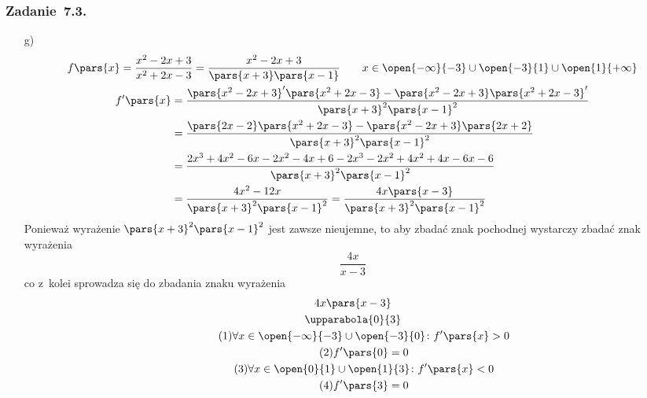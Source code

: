 \subsubsection*{Zadanie~7.3.}
\begin{itemize}
    \item[g)]
        \begin{gather*}
            f\pars{x} = \frac{x^2 - 2x + 3}{x^2 + 2x - 3} = \frac{x^2 - 2x + 3}{\pars{x + 3}\pars{x - 1}} \qquad x \in \open{-\infty}{-3} \cup \open{-3}{1} \cup \open{1}{+\infty}\\
            \begin{split}
                f'\pars{x}
                    &= \frac{\pars{x^2 - 2x + 3}'\pars{x^2 + 2x - 3} - \pars{x^2 - 2x + 3}\pars{x^2 + 2x - 3}'}{\pars{x + 3}^2\pars{x - 1}^2}\\
                    &= \frac{\pars{2x - 2}\pars{x^2 + 2x - 3} - \pars{x^2 - 2x + 3}\pars{2x + 2}}{\pars{x + 3}^2\pars{x - 1}^2}\\
                    &= \frac{2x^3 + 4x^2 - 6x - 2x^2 - 4x + 6 - 2x^3 - 2x^2 + 4x^2 + 4x - 6x - 6}{\pars{x + 3}^2\pars{x - 1}^2}\\
                    &= \frac{4x^2 - 12x}{\pars{x + 3}^2\pars{x - 1}^2}
                    = \frac{4x\pars{x - 3}}{\pars{x + 3}^2\pars{x - 1}^2}
            \end{split}
        \end{gather*}
        Ponieważ wyrażenie \(\pars{x + 3}^2\pars{x - 1}^2\) jest zawsze nieujemne, to aby zbadać znak pochodnej wystarczy zbadać znak wyrażenia
        \begin{equation*}
            \frac{4x}{x - 3}
        \end{equation*}
        co z~kolei sprowadza się do zbadania znaku wyrażenia
        \begin{gather*}
            4x\pars{x - 3}\\
            \upparabola{0}{3}\\
            \tag{\(1\)} \forall x \in \open{-\infty}{-3} \cup \open{-3}{0}\colon f'\pars{x} > 0 \label{2020_10_20:7_3:g:first_increase}\\
            \tag{\(2\)} f'\pars{0} = 0 \label{2020_10_20:7_3:g:first_zero}\\
            \tag{\(3\)} \forall x \in \open{0}{1} \cup \open{1}{3}\colon f'\pars{x} < 0 \label{2020_10_20:7_3:g:decrease}\\
            \tag{\(4\)} f'\pars{3} = 0 \label{2020_10_20:7_3:g:second_zero}\\

\end{gather*}
\end{itemize}
